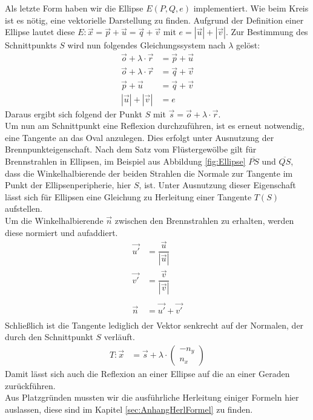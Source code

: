 \documentclass[reducespace,stylepage,semiarbeit]{spezidoc}
\begin{document}
Als letzte Form haben wir die Ellipse $E(P, Q, e)$ implementiert.
Wie beim Kreis ist es nötig, eine vektorielle Darstellung zu finden. 
Aufgrund der Definition einer Ellipse lautet diese $E: \vec{x} = \vec{p} + \vec{u} = \vec{q} + \vec{v}$ mit $ e = |\vec{u}| + |\vec{v}|$.
Zur Bestimmung des Schnittpunkts $S$ wird nun folgendes Gleichungssystem nach $\lambda$ gelöst:
\begin{equation*}
\begin{split}
\vec{o} + \lambda \cdot \vec{r} &= \vec{p} + \vec{u} \\
\vec{o} + \lambda \cdot \vec{r} &= \vec{q} + \vec{v} \\
\vec{p} + \vec{u} &= \vec{q} + \vec{v} \\
|\vec{u}| + |\vec{v}| &= e
\end{split}
\end{equation*}
Daraus ergibt sich folgend der Punkt $S$ mit $\vec{s} = \vec{o} + \lambda \cdot \vec{r}$.\\
Um nun am Schnittpunkt eine Reflexion durchzuführen, ist es erneut notwendig, eine Tangente an das Oval anzulegen. 
Dies erfolgt unter Ausnutzung der Brennpunkteigenschaft. %
Nach dem Satz vom Flüstergewölbe gilt für Brennstrahlen in Ellipsen, im Beispiel aus Abbildung \ref{fig:Ellipse} $\overline{PS}$ und $\overline{QS}$, dass die Winkelhalbierende der beiden Strahlen die Normale zur Tangente im Punkt der Ellipsenperipherie, hier $S$, ist.
Unter Ausnutzung dieser Eigenschaft lässt sich für Ellipsen eine Gleichung zu Herleitung einer Tangente $T(S)$ aufstellen.\\
Um die Winkelhalbierende $\vec{n}$ zwischen den Brennstrahlen zu erhalten, werden diese normiert und aufaddiert.
\begin{equation*}
\begin{split}
\vec{u'} & = \dfrac{\vec{u}}{|\vec{u}|} \\
\vec{v'}  &= \dfrac{\vec{v}}{|\vec{v}|} \\ \\
\vec{n} & = \vec{u'} + \vec{v'} \\ 
\end{split}
\end{equation*}
Schließlich ist die Tangente lediglich der Vektor senkrecht auf der Normalen, der durch den Schnittpunkt $S$ verläuft.
\begin{equation*}
\begin{split}
T: \vec{x} & = \vec{s} + \lambda \cdot \begin{pmatrix} -n_y \\ n_x \end{pmatrix}
\end{split}
\end{equation*}
Damit lässt sich auch die Reflexion an einer Ellipse auf die an einer Geraden zurückführen.\\
Aus Platzgründen mussten wir die ausführliche Herleitung einiger Formeln hier auslassen, diese sind im Kapitel \ref{sec:AnhangHerlFormel} zu finden.
\end{document}
